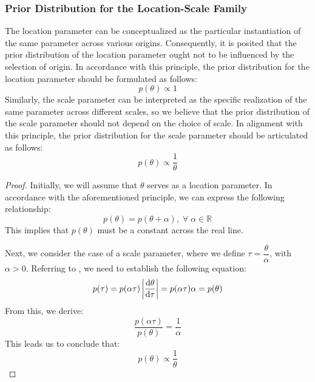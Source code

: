\subsubsection{Prior Distribution for the Location-Scale Family}
\begin{theorem}
	The location parameter can be conceptualized as the particular instantiation of the same parameter across various origins. Consequently, it is posited that the prior distribution of the location parameter ought not to be influenced by the selection of origin. In accordance with this principle, the prior distribution for the location parameter should be formulated as follows: 
	\begin{equation*}
		p(\theta)\propto1
	\end{equation*}
	Similarly, the scale parameter can be interpreted as the specific realization of the same parameter across different scales, so we believe that the prior distribution of the scale parameter should not depend on the choice of scale. In alignment with this principle, the prior distribution for the scale parameter should be articulated as follows:
	\begin{equation*}
		p(\theta)\propto\frac{1}{\theta}
	\end{equation*}
\end{theorem}
\begin{proof}
	Initially, we will assume that $\theta$ serves as a location parameter. In accordance with the aforementioned principle, we can express the following relationship:
	\begin{equation*}
		p(\theta) = p(\theta + \alpha), \;\forall\; \alpha \in \mathbb{R}^{}
	\end{equation*}
	This implies that $p(\theta)$ must be a constant across the real line. 
	
	Next, we consider the case of a scale parameter, where we define $\tau = \dfrac{\theta}{\alpha}$, with $\alpha > 0$. Referring to , we need to establish the following equation:
	\begin{equation*}
		p(\tau) = p(\alpha \tau) \left| \frac{\mathop{}\!\mathrm{d} \theta}{\mathop{}\!\mathrm{d}\tau} \right| = p(\alpha \tau) \alpha = p(\theta)
	\end{equation*}
	From this, we derive:
	\begin{equation*}
		\frac{p(\alpha \tau)}{p(\theta)} = \frac{1}{\alpha}
	\end{equation*}
	This leads us to conclude that:
	\begin{equation*}
		p(\theta) \propto \frac{1}{\theta}
	\end{equation*}
\end{proof}